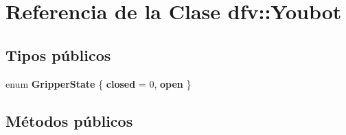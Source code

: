 \hypertarget{classdfv_1_1Youbot}{\section{\-Referencia de la \-Clase dfv\-:\-:\-Youbot}
\label{classdfv_1_1Youbot}
}
\subsection*{\-Tipos públicos}
\begin{DoxyCompactItemize}
\item 
enum {\bfseries \-Gripper\-State} \{ {\bfseries closed} =  0, 
{\bfseries open}
 \}
\end{DoxyCompactItemize}
\subsection*{\-Métodos públicos}
